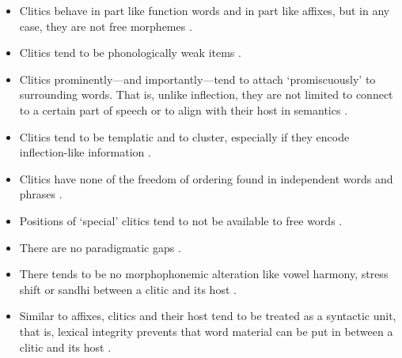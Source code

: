 \begin{itemize}
	\item Clitics behave in part like function words and in part like affixes, 
		but in any case, they are not free morphemes 
		\citep[38, 42]{spencerluis2012}.
	\item Clitics tend to be phonologically weak items 
		\citep[39]{spencerluis2012}.
	\item Clitics prominently---and importantly---tend to attach 
		`promiscuously' to surrounding words. That is, unlike inflection, they 
		are not limited to connect to a certain part of speech or to align 
		with their host in semantics \citep[40, 108–109]{spencerluis2012}.
	\item Clitics tend to be templatic and to cluster, especially if they 
		encode inflection-like information \citep[41, 47--48]{spencerluis2012}.
	\item Clitics have none of the freedom of ordering found in independent 
		words and phrases \citep[43]{spencerluis2012}.
	\item Positions of `special' clitics tend to not be available to free 
		words \citep[44]{spencerluis2012}.
	\item There are no paradigmatic gaps \citep[108--109]{spencerluis2012}.
	\item There tends to be no morphophonemic alteration like vowel harmony, 
		stress shift or sandhi between a clitic and its host 
		\citep[108--109]{spencerluis2012}.
	\item Similar to affixes, clitics and their host tend to be treated as a 
		syntactic unit, that is, lexical integrity prevents that word material
		can be put in between a clitic and its host 
		\citep[108, 110]{spencerluis2012}.
\end{itemize}

